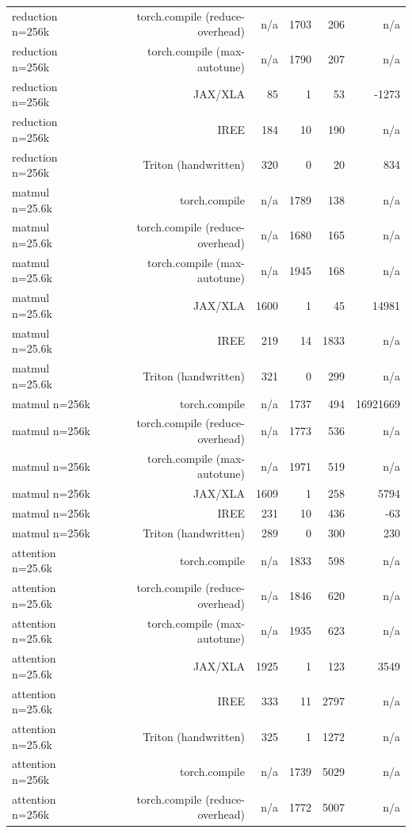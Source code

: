 \begin{tabular}{lrrrrr}
reduction n=256k & torch.compile (reduce-overhead) & n/a & 1703 & 206 & n/a \\
reduction n=256k & torch.compile (max-autotune) & n/a & 1790 & 207 & n/a \\
reduction n=256k & JAX/XLA & 85 & 1 & 53 & -1273 \\
reduction n=256k & IREE & 184 & 10 & 190 & n/a \\
reduction n=256k & Triton (handwritten) & 320 & 0 & 20 & 834 \\
matmul n=25.6k & torch.compile & n/a & 1789 & 138 & n/a \\
matmul n=25.6k & torch.compile (reduce-overhead) & n/a & 1680 & 165 & n/a \\
matmul n=25.6k & torch.compile (max-autotune) & n/a & 1945 & 168 & n/a \\
matmul n=25.6k & JAX/XLA & 1600 & 1 & 45 & 14981 \\
matmul n=25.6k & IREE & 219 & 14 & 1833 & n/a \\
matmul n=25.6k & Triton (handwritten) & 321 & 0 & 299 & n/a \\
matmul n=256k & torch.compile & n/a & 1737 & 494 & 16921669 \\
matmul n=256k & torch.compile (reduce-overhead) & n/a & 1773 & 536 & n/a \\
matmul n=256k & torch.compile (max-autotune) & n/a & 1971 & 519 & n/a \\
matmul n=256k & JAX/XLA & 1609 & 1 & 258 & 5794 \\
matmul n=256k & IREE & 231 & 10 & 436 & -63 \\
matmul n=256k & Triton (handwritten) & 289 & 0 & 300 & 230 \\
attention n=25.6k & torch.compile & n/a & 1833 & 598 & n/a \\
attention n=25.6k & torch.compile (reduce-overhead) & n/a & 1846 & 620 & n/a \\
attention n=25.6k & torch.compile (max-autotune) & n/a & 1935 & 623 & n/a \\
attention n=25.6k & JAX/XLA & 1925 & 1 & 123 & 3549 \\
attention n=25.6k & IREE & 333 & 11 & 2797 & n/a \\
attention n=25.6k & Triton (handwritten) & 325 & 1 & 1272 & n/a \\
attention n=256k & torch.compile & n/a & 1739 & 5029 & n/a \\
attention n=256k & torch.compile (reduce-overhead) & n/a & 1772 & 5007 & n/a \\

\end{tabular}
